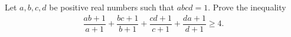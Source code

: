 Let $a,b,c,d$ be positive real numbers such that $abcd = 1$. Prove the inequality
\begin{align*}
\dfrac{ab+1}{a+1} + \dfrac{bc+1}{b+1} + \dfrac{cd+1}{c+1} + \dfrac{da+1}{d+1} \geq 4.
\end{align*}
